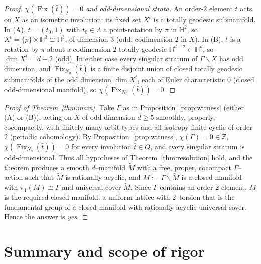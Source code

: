 \documentclass[12pt]{article}
\newcommand{\bZ}{\mathbb{Z}}
\newcommand{\bH}{\mathbb{H}}
\newcommand{\Fix}{\operatorname{Fix}}
\theoremstyle{definition}
\begin{document}
\begin{proof}
\emph{$\chi(\Fix(\bar t))=0$ and odd-dimensional strata.}  An order-$2$ element
$t$ acts on $X$ as an isometric involution; its fixed set $X^{t}$ is a totally
geodesic submanifold.  In (A), $t=(t_0,1)$ with $t_0\in\Lambda$ a point-rotation
by $\pi$ in $\bH^2$, so $X^{t}=\{p\}\times\bH^3\cong\bH^3$, of dimension $3$ (odd,
codimension $2$ in $X$).  In (B), $t$ is a rotation by $\pi$ about a
codimension-$2$ totally geodesic $\bH^{d-2}\subset\bH^d$, so $\dim X^{t}=d-2$
(odd).  In either case every singular stratum of $\Gamma\backslash X$ has odd
dimension, and $\Fix_{N_0}(\bar t)$ is a finite disjoint union of closed totally
geodesic submanifolds of the odd dimension $\dim X^{t}$, each of Euler
characteristic $0$ (closed odd-dimensional manifold), so
$\chi(\Fix_{N_0}(\bar t))=0$.
\end{proof}

\begin{proof}[Proof of Theorem~\ref{thm:main}]
Take $\Gamma$ as in Proposition~\ref{prop:witness} (either (A) or (B)), acting on
$X$ of odd dimension $d\ge5$ smoothly, properly, cocompactly, with finitely many
orbit types and all isotropy finite cyclic of order $2$ (periodic cohomology).
By Proposition~\ref{prop:witness}, $\chi(\Gamma)=0\in\bZ$,
$\chi(\Fix_{N_0}(\bar t))=0$ for every involution $\bar t\in Q$, and every
singular stratum is odd-dimensional.  Thus all hypotheses of
Theorem~\ref{thm:resolution} hold, and the theorem produces a smooth
$d$--manifold $\widetilde M$ with a free, proper, cocompact $\Gamma$--action such
that $\widetilde M$ is rationally acyclic, and $M:=\Gamma\backslash\widetilde M$ is
a closed manifold with $\pi_1(M)\cong\Gamma$ and universal cover $\widetilde M$.
Since $\Gamma$ contains an order-$2$ element, $M$ is the required closed manifold:
a uniform lattice with $2$--torsion that is the fundamental group of a closed
manifold with rationally acyclic universal cover.  Hence the answer is
\emph{yes}.
\end{proof}

\section{Summary and scope of rigor}
\end{document}
